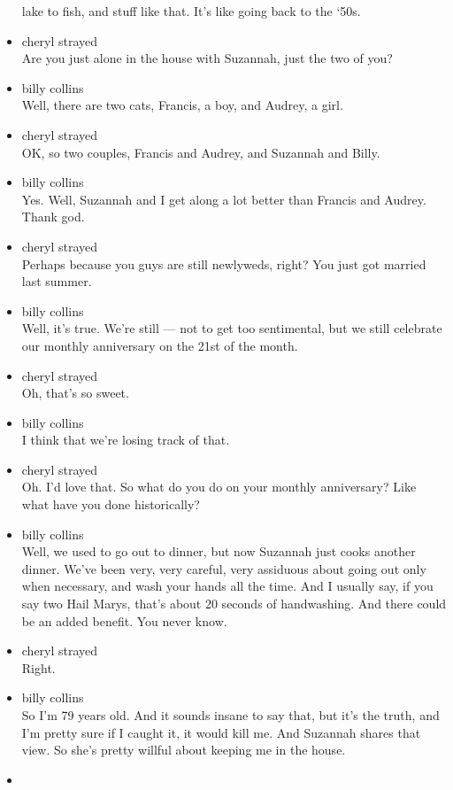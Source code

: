 \begin{itemize}
  lake to fish, and stuff like that. It's like going back to the `50s.
\item
  cheryl strayed\\
  Are you just alone in the house with Suzannah, just the two of you?
\item
  billy collins\\
  Well, there are two cats, Francis, a boy, and Audrey, a girl.
\item
  cheryl strayed\\
  OK, so two couples, Francis and Audrey, and Suzannah and Billy.
\item
  billy collins\\
  Yes. Well, Suzannah and I get along a lot better than Francis and
  Audrey. Thank god.
\item
  cheryl strayed\\
  Perhaps because you guys are still newlyweds, right? You just got
  married last summer.
\item
  billy collins\\
  Well, it's true. We're still --- not to get too sentimental, but we
  still celebrate our monthly anniversary on the 21st of the month.
\item
  cheryl strayed\\
  Oh, that's so sweet.
\item
  billy collins\\
  I think that we're losing track of that.
\item
  cheryl strayed\\
  Oh. I'd love that. So what do you do on your monthly anniversary? Like
  what have you done historically?
\item
  billy collins\\
  Well, we used to go out to dinner, but now Suzannah just cooks another
  dinner. We've been very, very careful, very assiduous about going out
  only when necessary, and wash your hands all the time. And I usually
  say, if you say two Hail Marys, that's about 20 seconds of
  handwashing. And there could be an added benefit. You never know.
\item
  cheryl strayed\\
  Right.
\item
  billy collins\\
  So I'm 79 years old. And it sounds insane to say that, but it's the
  truth, and I'm pretty sure if I caught it, it would kill me. And
  Suzannah shares that view. So she's pretty willful about keeping me in
  the house.
\item

\end{itemize}
